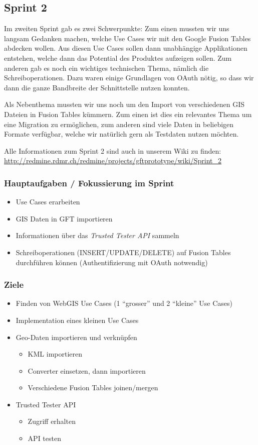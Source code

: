 \subsection{Sprint 2}

Im zweiten Sprint gab es zwei Schwerpunkte: Zum einen mussten wir uns langsam Gedanken machen, welche Use Cases wir mit den Google Fusion Tables abdecken wollen. Aus diesen Use Cases sollen dann unabhängige Applikationen entstehen, welche dann das Potential des Produktes aufzeigen sollen. Zum anderen gab es noch ein wichtiges technischen Thema, nämlich die Schreiboperationen. Dazu waren einige Grundlagen von OAuth nötig, so dass wir dann die ganze Bandbreite der Schnittstelle nutzen konnten.

Als Nebenthema mussten wir uns noch um den Import von verschiedenen GIS Dateien in Fusion Tables kümmern. Zum einen ist dies ein relevantes Thema um eine Migration zu ermöglichen, zum anderen sind viele Daten in beliebigen Formate verfügbar, welche wir natürlich gern als Testdaten nutzen möchten.

Alle Informationen zum Sprint 2 sind auch in unserem Wiki zu finden:
\url{http://redmine.rdmr.ch/redmine/projects/gftprototype/wiki/Sprint_2}

\subsubsection{Hauptaufgaben / Fokussierung im Sprint}
\begin{itemize}
	\item Use Cases erarbeiten
	\item \gls{GIS} Daten in GFT importieren
	\item Informationen über das \emph{Trusted Tester API} sammeln
	\item Schreiboperationen (INSERT/UPDATE/DELETE) auf Fusion Tables durchführen können (Authentifizierung mit OAuth notwendig)
\end{itemize}

\subsubsection{Ziele}
\begin{itemize}
	\item Finden von WebGIS Use Cases (1 "`grosser"' und 2 "`kleine"' Use Cases)
	\item Implementation eines kleinen Use Cases
	\item Geo-Daten importieren und verknüpfen
	\begin{itemize}
		\item KML importieren
		\item Converter einsetzen, dann importieren
		\item Verschiedene Fusion Tables joinen/mergen
	\end{itemize}
	\item Trusted Tester API
	\begin{itemize}
		\item Zugriff erhalten
		\item API testen
	\end{itemize}
\end{itemize}

